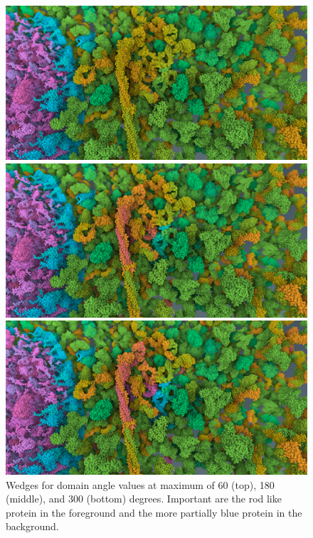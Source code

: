\documentclass{article}
\begin{document}
	\begin{figure}[t]
		\includegraphics[width=0.95\linewidth,keepaspectratio]{supplementaryMaterial/domain60} 
		
		\vspace{0.1cm}
		
		\includegraphics[width=0.95\linewidth,keepaspectratio]{supplementaryMaterial/domain180} 
		
		\vspace{0.1cm}
		
		\includegraphics[width=0.95\linewidth,keepaspectratio]{supplementaryMaterial/domain300} 
		\caption{Wedges for domain angle values at maximum of 60 (top), 180 (middle), and 300 (bottom) degrees. Important are the rod like protein in the foreground and the more partially blue protein in the background.}
	\end{figure}
	
\end{document}

